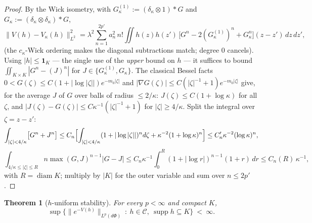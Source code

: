 \documentclass[11pt,a4paper]{article}
\theoremstyle{plain}
\newtheorem{theorem}{Theorem}[section]
\theoremstyle{definition}
\DeclareMathOperator{\supp}{supp}
\begin{document}
\begin{proof}
By the Wick isometry, with $G^{(1)}_\kappa:=(\delta_\kappa\otimes1)*G$ and
$G_\kappa:=(\delta_\kappa\otimes\delta_\kappa)*G$,
\[
  \|V(h)-V_\kappa(h)\|_{L^2}^2
  =\lambda^2\sum_{n=1}^{2p'}a_n^2\,n!\iint h(z)h(z')\,
  \bigl[G^n-2(G^{(1)}_\kappa)^n+G_\kappa^n\bigr](z-z')\,dz\,dz' ,
\]
(the $c_\kappa$-Wick ordering makes the diagonal subtractions match; degree $0$ cancels).
Using $|h|\le\mathbf 1_K$ --- the single use of the \emph{upper} bound on $h$ --- it suffices to
bound $\iint_{K\times K}|G^n-(J)^n|$ for $J\in\{G^{(1)}_\kappa,G_\kappa\}$. The classical Bessel
facts $0<G(\zeta)\le C(1+|\log|\zeta||)e^{-m_0|\zeta|}$ and
$|\nabla G(\zeta)|\le C(|\zeta|^{-1}+1)e^{-m_0|\zeta|}$ give, for the average $J$ of $G$ over
balls of radius $\le2/\kappa$:
$J(\zeta)\le C(1+\log\kappa)$ for all $\zeta$, and
$|J(\zeta)-G(\zeta)|\le C\kappa^{-1}(|\zeta|^{-1}+1)$ for $|\zeta|\ge4/\kappa$. Split the
integral over $\zeta=z-z'$:
\[
  \int_{|\zeta|<4/\kappa}\bigl[G^n+J^n\bigr]
  \le C_n\Bigl[\int_{|\zeta|<4/\kappa}(1+|\log|\zeta||)^nd\zeta+\kappa^{-2}(1+\log\kappa)^n\Bigr]
  \le C_n'\kappa^{-2}(\log\kappa)^n,
\]
\[
  \int_{4/\kappa\le|\zeta|\le R}n\max(G,J)^{n-1}|G-J|
  \le C_n\kappa^{-1}\!\int_0^R(1+|\log r|)^{n-1}(1+r)\,dr
  \le C_n(R)\,\kappa^{-1},
\]
with $R=\operatorname{diam}K$; multiply by $|K|$ for the outer variable and sum over $n\le2p'$.
\end{proof}

\begin{theorem}[$h$-uniform stability]\label{thm:stability}
For every $p<\infty$ and compact $K$,
\[
  \sup\bigl\{\|e^{-V(h)}\|_{L^p(d\Phi)}\ :\ h\in\mathcal C,\ \supp h\subseteq K\bigr\}\ <\ \infty .
\]
\end{theorem}
\end{document}
